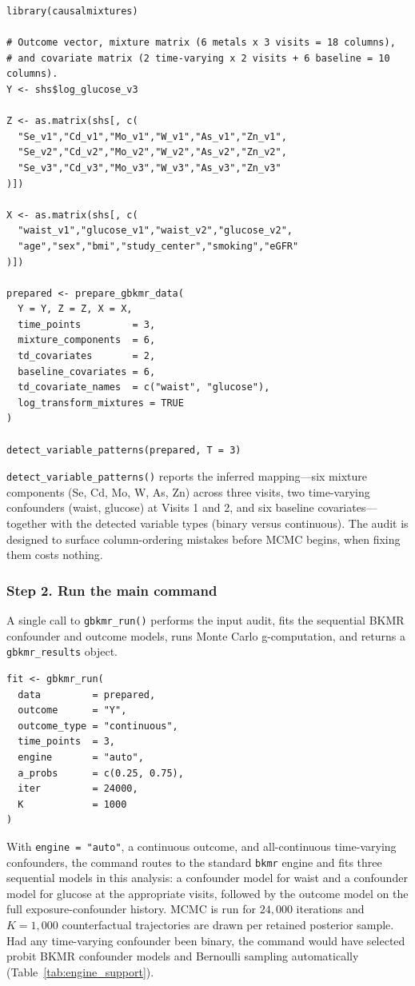 \documentclass[11pt]{article}
\newcommand{\pkg}[1]{\texttt{#1}}
\newcommand{\code}[1]{\texttt{#1}}
\begin{document}
\begin{verbatim}
library(causalmixtures)

# Outcome vector, mixture matrix (6 metals x 3 visits = 18 columns),
# and covariate matrix (2 time-varying x 2 visits + 6 baseline = 10 columns).
Y <- shs$log_glucose_v3

Z <- as.matrix(shs[, c(
  "Se_v1","Cd_v1","Mo_v1","W_v1","As_v1","Zn_v1",
  "Se_v2","Cd_v2","Mo_v2","W_v2","As_v2","Zn_v2",
  "Se_v3","Cd_v3","Mo_v3","W_v3","As_v3","Zn_v3"
)])

X <- as.matrix(shs[, c(
  "waist_v1","glucose_v1","waist_v2","glucose_v2",
  "age","sex","bmi","study_center","smoking","eGFR"
)])

prepared <- prepare_gbkmr_data(
  Y = Y, Z = Z, X = X,
  time_points         = 3,
  mixture_components  = 6,
  td_covariates       = 2,
  baseline_covariates = 6,
  td_covariate_names  = c("waist", "glucose"),
  log_transform_mixtures = TRUE
)

detect_variable_patterns(prepared, T = 3)
\end{verbatim}

\code{detect\_variable\_patterns()} reports the inferred mapping---six mixture components (Se, Cd, Mo, W, As, Zn) across three visits, two time-varying confounders (waist, glucose) at Visits 1 and 2, and six baseline covariates---together with the detected variable types (binary versus continuous). The audit is designed to surface column-ordering mistakes before MCMC begins, when fixing them costs nothing.

\subsubsection*{Step 2. Run the main command}
A single call to \code{gbkmr\_run()} performs the input audit, fits the sequential BKMR confounder and outcome models, runs Monte Carlo g-computation, and returns a \code{gbkmr\_results} object.

\begin{verbatim}
fit <- gbkmr_run(
  data         = prepared,
  outcome      = "Y",
  outcome_type = "continuous",
  time_points  = 3,
  engine       = "auto",
  a_probs      = c(0.25, 0.75),
  iter         = 24000,
  K            = 1000
)
\end{verbatim}

With \code{engine = "auto"}, a continuous outcome, and all-continuous time-varying confounders, the command routes to the standard \pkg{bkmr} engine and fits three sequential models in this analysis: a confounder model for waist and a confounder model for glucose at the appropriate visits, followed by the outcome model on the full exposure-confounder history. MCMC is run for $24{,}000$ iterations and $K = 1{,}000$ counterfactual trajectories are drawn per retained posterior sample. Had any time-varying confounder been binary, the command would have selected probit BKMR confounder models and Bernoulli sampling automatically (Table~\ref{tab:engine_support}).
\end{document}
